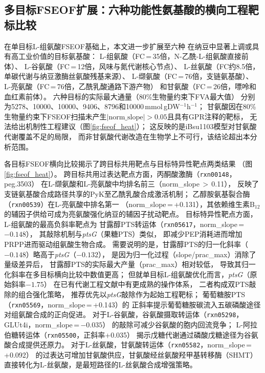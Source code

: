 \documentclass[10pt, a4paper, twocolumn]{ctexart}
\newcommand{\fseof}{FSEOF}
\newcommand{\mmolg}{mmol\,gDW$^{-1}$h$^{-1}$}
\newcommand{\NAH}{N-乙酰-L-组氨酸}
\begin{document}

\subsection{多目标FSEOF扩展：六种功能性氨基酸的横向工程靶标比较}

在单目标L-组氨酸\fseof{}基础上，本文进一步扩展至六种
在纳豆中显著上调或具有高工业价值的目标氨基酸：
L-组氨酸（FC\,=\,35倍，\NAH{}直接前体）、
L-谷氨酸（FC\,=\,12倍，风味与氮代谢核心节点）、
L-丝氨酸（FC约8.5倍，单碳代谢与纳豆激酶丝氨酸残基来源）、
L-缬氨酸（FC\,=\,76倍，支链氨基酸）、
L-亮氨酸（FC\,=\,76倍，乙酰乳酸通路下游产物）
和甘氨酸（FC\,=\,26倍，嘌呤和血红素前体）。
六种目标的实际最大通量（80\%生物量约束下FVA最大值）
分别为5278、10000、10000、9406、8796和10000\,\mmolg{}；
甘氨酸因在80\%生物量约束下FSEOF扫描未产生$|\text{norm\_slope}|>0.05$且具有GPR注释的靶标，
无法给出机制性工程建议（图\ref{fig:fseof_heat}）；
这反映的是iBsu1103模型对甘氨酸代谢覆盖不足的局限，
而非甘氨酸代谢改造在生物学上不可行，该结论超出本分析范围。

各目标\fseof{}横向比较揭示了跨目标共用靶点与目标特异性靶点两类结果
（图\ref{fig:fseof_heat}）。
跨目标共用过表达靶点方面，丙酮酸激酶（\texttt{rxn00148}，peg.3503）
在L-缬氨酸和L-亮氨酸中均排名前三（norm\_slope\,$>$\,0.11），
反映了支链氨基酸合成路径共享的PyK至乙酰乳酸合成激活机制；
乙醇胺氨基裂合酶（\texttt{rxn00539}）在L-亮氨酸中排名第一
（norm\_slope\,=\,+0.131），其依赖维生素B$_{12}$
的辅因子供给可成为亮氨酸强化纳豆的辅因子扰动靶点。
目标特异性靶点方面，L-组氨酸的最高负斜率靶点为
甘露醇PTS转运体（\texttt{rxn05617}，norm\_slope\,=\,$-0.148$），
其敲除机制与\textit{ptsG}（果糖PTS）类似，
即减少PEP消耗进而增加PRPP进而驱动组氨酸生物合成。
需要说明的是，甘露醇PTS的归一化斜率（$-0.148$）略高于\textit{ptsG}（$-0.132$），
是因为归一化过程（slope/prac\_max）消除了量级差异后，
甘露醇PTS的实际最大产量（prac\_max）相对较低，
导致其归一化斜率在多目标横向比较中数值更高；
但就单目标L-组氨酸优化而言，\textit{ptsG}（原始斜率$-1.75$）
在已有代谢工程文献中有更成熟的操作体系，
二者构成双PTS敲除的组合强化策略，
推荐优先以\textit{ptsG}敲除作为起始工程靶标；
葡萄糖胺PTS（\texttt{rxn05569}，norm\_slope\,=\,+0.143）的
正斜率提示葡萄糖胺碳流入五碳磷酸途径对组氨酸合成的正向促进。
对于L-谷氨酸，谷氨酸摄取转运体（\texttt{rxn05298}，GLUt4i，norm\_slope\,=\,$-0.035$）
的敲除可减少谷氨酸的胞内回流竞争；
L-阿拉伯糖转运体（\texttt{rxn05500}，正斜率+0.035）
揭示戊糖代谢通过磷酸戊糖途径为谷氨酸合成提供还原力。
对于L-丝氨酸，甘氨酸转运体（\texttt{rxn05582}，norm\_slope\,=\,+0.092）
的过表达可增加甘氨酸供应，甘氨酸经丝氨酸羟甲基转移酶（SHMT）
直接转化为L-丝氨酸，是最短路径的L-丝氨酸合成增强策略。
\end{document}
